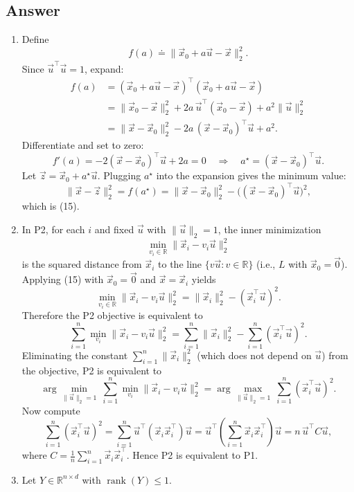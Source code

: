 \documentclass[
  12pt,
]{fphw}
\begin{document}
\subsection*{Answer}
\begin{enumerate}
\item[(a)] Define
\[
f(a) \doteq \|\vec x_0 + a\vec u - \vec x\|_2^2.
\]
Since $\vec u^\top \vec u = 1$, expand:
\begin{align*}
f(a)
&= (\vec x_0 + a\vec u - \vec x)^\top(\vec x_0 + a\vec u - \vec x) \\
&= \|\vec x_0-\vec x\|_2^2 + 2a\,\vec u^\top(\vec x_0-\vec x) + a^2\|\vec u\|_2^2 \\
&= \|\vec x-\vec x_0\|_2^2 - 2a\,(\vec x-\vec x_0)^\top \vec u + a^2.
\end{align*}
Differentiate and set to zero:
\[
f'(a) = -2(\vec x-\vec x_0)^\top \vec u + 2a = 0
\quad\Longrightarrow\quad
a^\star = (\vec x-\vec x_0)^\top \vec u.
\]
Let $\vec z = \vec x_0 + a^\star \vec u$. Plugging $a^\star$ into the expansion gives the minimum value:
\[
\|\vec x-\vec z\|_2^2
= f(a^\star)
= \|\vec x-\vec x_0\|_2^2 - \big((\vec x-\vec x_0)^\top \vec u\big)^2,
\]
which is (15).

\item[(b)] In P2, for each $i$ and fixed $\vec u$ with $\|\vec u\|_2=1$, the inner minimization
\[
\min_{v_i\in\mathbb{R}} \|\vec x_i - v_i \vec u\|_2^2
\]
is the squared distance from $\vec x_i$ to the line $\{v\vec u: v\in\mathbb{R}\}$ (i.e., $L$ with $\vec x_0=\vec 0$).
Applying (15) with $\vec x_0=\vec 0$ and $\vec x=\vec x_i$ yields
\[
\min_{v_i\in\mathbb{R}} \|\vec x_i - v_i \vec u\|_2^2
= \|\vec x_i\|_2^2 - (\vec x_i^\top \vec u)^2.
\]
Therefore the P2 objective is equivalent to
\[
\sum_{i=1}^n \min_{v_i} \|\vec x_i - v_i \vec u\|_2^2
= \sum_{i=1}^n \|\vec x_i\|_2^2 - \sum_{i=1}^n (\vec x_i^\top \vec u)^2.
\]
Eliminating the constant $\sum_{i=1}^n \|\vec x_i\|_2^2$ (which does not depend on $\vec u$) from the objective, P2 is equivalent to
\[
\arg\min_{\|\vec u\|_2=1}\ \sum_{i=1}^n \min_{v_i} \|\vec x_i - v_i \vec u\|_2^2
=
\arg\max_{\|\vec u\|_2=1}\ \sum_{i=1}^n (\vec x_i^\top \vec u)^2.
\]
Now compute
\[
\sum_{i=1}^n (\vec x_i^\top \vec u)^2
= \sum_{i=1}^n \vec u^\top (\vec x_i \vec x_i^\top)\vec u
= \vec u^\top \left(\sum_{i=1}^n \vec x_i \vec x_i^\top\right)\vec u
= n\,\vec u^\top C \vec u,
\]
where $C=\frac1n\sum_{i=1}^n \vec x_i\vec x_i^\top$. Hence P2 is equivalent to P1.

\item[(c)] Let $Y\in\mathbb{R}^{n\times d}$ with $\operatorname{rank}(Y)\le 1$.


\end{enumerate}
\end{document}
